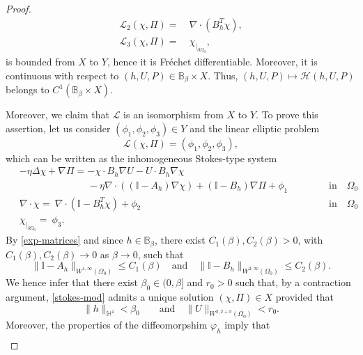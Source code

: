 \documentclass[11pt,a4paper]{amsart}
\theoremstyle{remark}
\theoremstyle{definition}
\numberwithin{equation}{section}
\numberwithin{proposition}{section}
\begin{document}
\begin{proof}
\begin{equation*}
\begin{aligned}
\mathcal{L}_2( \chi, \Pi)= & \ \nabla \cdot (B_h^T\chi),\\[5pt]
\mathcal{L}_3( \chi, \Pi)  = &  \ \chi_{|_{\partial \Omega_0}},
\end{aligned}
\end{equation*} is bounded from  $X$ to $Y$, hence it is Fréchet differentiable. Moreover, it is continuous with respect to $(h,U,P)\in \mathbb{B}_\beta\times X$.
Thus, $(h, U, P) \mapsto\mathcal{H}(h, U, P)$ belongs to $C^1(  \mathbb{B}_\beta\times X)$. \par Moreover, we claim that $\mathcal{L}$ is an isomorphism from $X$ to $Y$. To prove this assertion, let us consider $(\phi_1, \phi_2, \phi_3 )\in Y$ and the linear elliptic problem \begin{equation}\label{iso-eq}\mathcal{L}(\chi, \Pi)= (\phi_1, \phi_2, \phi_3), \end{equation} which can be written as the inhomogeneous Stokes-type system
\begin{equation}\label{stokes-mod}\begin{aligned}
&-\eta \Delta \chi + \nabla \Pi =  - \chi \cdot B_h\nabla U -U\cdot B_h\nabla \chi \\
&  \quad \qquad \qquad \qquad-\eta\nabla \cdot ((\mathbb{I}-A_h)\nabla \chi) + (\mathbb{I}-B_h)\nabla \Pi + \phi_1 \quad &&&&\mbox{in}  \quad \Omega_0 \\[5pt]\ &\nabla\cdot \chi  = \ \nabla \cdot (\mathbb{I}-B_h^T \chi) +\phi_2 \quad &&&&\mbox{in} \quad \Omega_0 \\[5pt]
&\chi_{|_{\partial \Omega_0}}= \ \phi_3.
\end{aligned}
\end{equation}
By \eqref{exp-matrices} and since $h\in \mathbb{B}_\beta$, there exist $C_1(\beta),C_2(\beta)>0$, with $C_{1}(\beta), C_2(\beta)\rightarrow 0$ as $\beta\rightarrow 0$, such that
$$\|\mathbb{I}-A_h\|_{W^{1, \infty}(\Omega_0)}\leq C_1(\beta) \quad \text{and} \quad \|\mathbb{I}-B_h\|_{W^{2,\infty}(\Omega_0)}\leq C_2(\beta).$$ We hence infer that
there exist $\beta_0\in (0, \beta]$ and $r_0>0$ such that, by a contraction argument,  \eqref{stokes-mod} admits a unique solution $(\chi, \Pi)\in X$ provided that
\begin{equation}\label{small-cond}
\|h\|_{\mathbb{H}^4}<\beta_0 \qquad \mbox{and} \quad 	\|U\|_{W^{2, 2+\sigma}(\Omega_0)}< r_0.
\end{equation} Moreover, the properties of the diffeomorpshim $\varphi_h$ imply that
\begin{equation}\label{controlU-u}\begin{aligned}

\end{aligned}
\end{equation}
\end{proof}
\end{document}
